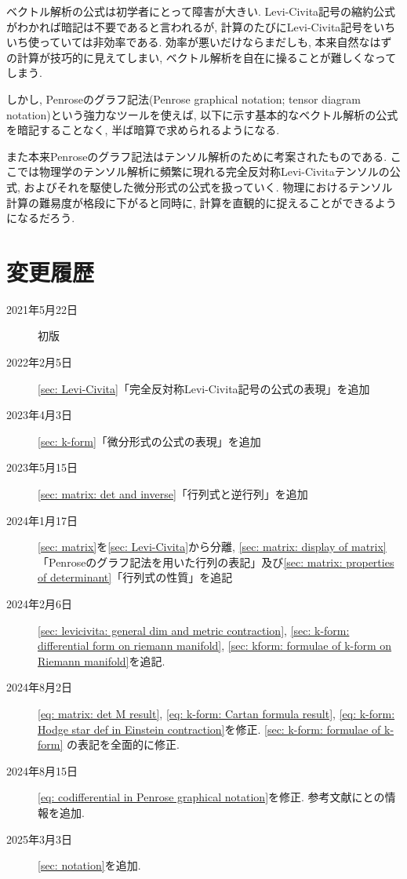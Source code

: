 \documentclass[dvipdfmx]{jsarticle}
\author{齊藤 巧磨}
\begin{document}
\maketitle

ベクトル解析の公式は初学者にとって障害が大きい.
Levi-Civita記号の縮約公式がわかれば暗記は不要であると言われるが, 計算のたびにLevi-Civita記号をいちいち使っていては非効率である.
効率が悪いだけならまだしも, 本来自然なはずの計算が技巧的に見えてしまい, ベクトル解析を自在に操ることが難しくなってしまう.

しかし, Penroseのグラフ記法(Penrose graphical notation; tensor diagram notation)という強力なツールを使えば, 以下に示す基本的なベクトル解析の公式を暗記することなく, 半ば暗算で求められるようになる.

また本来Penroseのグラフ記法はテンソル解析のために考案されたものである.
ここでは物理学のテンソル解析に頻繁に現れる完全反対称Levi-Civitaテンソルの公式, およびそれを駆使した微分形式の公式を扱っていく.
物理におけるテンソル計算の難易度が格段に下がると同時に, 計算を直観的に捉えることができるようになるだろう.


\section*{変更履歴}
\begin{description}
    \item[2021年5月22日] 初版
    \item[2022年2月5日] \ref{sec: Levi-Civita}「完全反対称Levi-Civita記号の公式の表現」を追加
    \item[2023年4月3日] \ref{sec: k-form}「微分形式の公式の表現」を追加
    \item[2023年5月15日] \ref{sec: matrix: det and inverse}「行列式と逆行列」を追加
    \item[2024年1月17日] \ref{sec: matrix}を\ref{sec: Levi-Civita}から分離, \ref{sec: matrix: display of matrix}「Penroseのグラフ記法を用いた行列の表記」及び\ref{sec: matrix: properties of determinant}「行列式の性質」を追記
    \item[2024年2月6日] \ref{sec: levicivita: general dim and metric contraction}, \ref{sec: k-form: differential form on riemann manifold}, \ref{sec: kform: formulae of k-form on Riemann manifold}を追記.
    \item[2024年8月2日] \eqref{eq: matrix: det M result}, \eqref{eq: k-form: Cartan formula result}, \eqref{eq: k-form: Hodge star def in Einstein contraction}を修正. \ref{sec: k-form: formulae of k-form} の表記を全面的に修正.
    \item[2024年8月15日] \eqref{eq: codifferential in Penrose graphical notation}を修正. 参考文献に\cite{Penrose and Rindler}と\cite{boosting}の情報を追加.
    \item[2025年3月3日] \ref{sec: notation}を追加.
\end{description}
\end{document}
